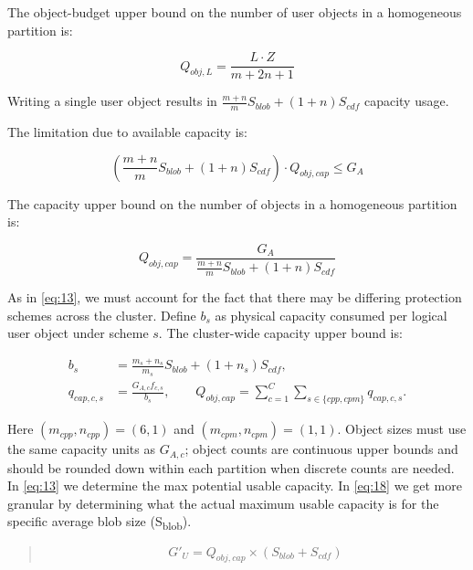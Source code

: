 The object-budget upper bound on the number of user objects in a homogeneous partition is:


\nopagebreak
\begin{equation}\label{eq:15}
Q_{obj,L}=\frac{L\cdot Z}{m+2n+1}
\end{equation}


Writing a single user object results in \(\frac{m+n}{m}S_{blob}+(1+n)S_{cdf}\) capacity usage.

The limitation due to available capacity is:


\nopagebreak
\begin{equation}\label{eq:16}
\left(\frac{m+n}{m}S_{blob}+(1+n)S_{cdf}\right)\cdot Q_{obj,cap}\leq G_A
\end{equation}


The capacity upper bound on the number of objects in a homogeneous partition is:


\nopagebreak
\begin{equation}\label{eq:17}
Q_{obj,cap}=\frac{G_A}{\frac{m+n}{m}S_{blob}+(1+n)S_{cdf}}
\end{equation}


As in \eqref{eq:13}, we must account for the fact that there may be differing protection schemes across the cluster. Define \(b_s\) as physical capacity consumed per logical user object under scheme \(s\). The cluster-wide capacity upper bound is:


\nopagebreak
\begin{equation}\label{eq:18}
\begin{aligned}
b_s&=\frac{m_s+n_s}{m_s}S_{blob}+(1+n_s)S_{cdf},\\
q_{cap,c,s}&=\frac{G_{A,c}f_{c,s}}{b_s},\qquad
Q_{obj,cap}=\sum_{c=1}^{C}\sum_{s\in\{cpp,cpm\}}q_{cap,c,s}.
\end{aligned}
\end{equation}
 

Here \((m_{cpp},n_{cpp})=(6,1)\) and \((m_{cpm},n_{cpm})=(1,1)\). Object sizes must use the same capacity units as \(G_{A,c}\); object counts are continuous upper bounds and should be rounded down within each partition when discrete counts are needed. In \eqref{eq:13} we determine the max potential usable capacity. In \eqref{eq:18} we get more granular by determining what the actual maximum usable capacity is for the specific average blob size (S\textsubscript{blob}).

\begin{quote}

\nopagebreak
\begin{equation}\label{eq:19}
G'_U=Q_{obj,cap}\times\left(S_{blob}+S_{cdf}\right)
\end{equation}
 
\end{quote}

